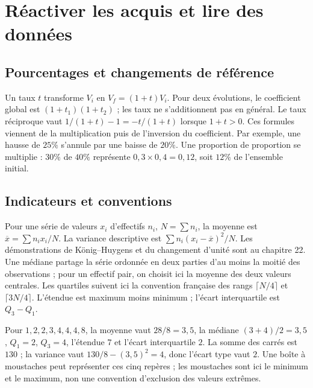\documentclass[11pt,a4paper,oneside]{book}
\begin{document}
\chapter{Réactiver les acquis et lire des données}
\section{Pourcentages et changements de référence}
Un taux $t$ transforme $V_i$ en $V_f=(1+t)V_i$.
Pour deux évolutions, le coefficient global est $(1+t_1)(1+t_2)$ ;
les taux ne s'additionnent pas en général.
Le taux réciproque vaut $1/(1+t)-1=-t/(1+t)$ lorsque $1+t>0$.
Ces formules viennent de la multiplication puis de l'inversion du coefficient.
Par exemple, une hausse de $25\%$ s'annule par une baisse de $20\%$.
Une proportion de proportion se multiplie : $30\%$ de $40\%$ représente
$0{,}3\times0{,}4=0{,}12$, soit $12\%$ de l'ensemble initial.

\section{Indicateurs et conventions}
Pour une série de valeurs $x_i$ d'effectifs $n_i$, $N=\sum n_i$,
la moyenne est $\overline x=\sum n_ix_i/N$.
La variance descriptive est $\sum n_i(x_i-\overline x)^2/N$.
Les démonstrations de König--Huygens et du changement d'unité sont au chapitre 22.
Une médiane partage la série ordonnée en deux parties d'au moins la moitié
des observations ; pour un effectif pair, on choisit ici la moyenne des deux
valeurs centrales. Les quartiles suivent ici la convention française des rangs
$\lceil N/4\rceil$ et $\lceil3N/4\rceil$.
L'étendue est maximum moins minimum ; l'écart interquartile est $Q_3-Q_1$.

Pour $1,2,2,3,4,4,4,8$, la moyenne vaut $28/8=3{,}5$,
la médiane $(3+4)/2=3{,}5$, $Q_1=2$, $Q_3=4$, l'étendue $7$
et l'écart interquartile $2$.
La somme des carrés est $130$ ; la variance vaut $130/8-(3{,}5)^2=4$,
donc l'écart type vaut $2$.
Une boîte à moustaches peut représenter ces cinq repères ; les moustaches
sont ici le minimum et le maximum, non une convention d'exclusion des valeurs extrêmes.
\begin{center}
\end{center}
\end{document}
